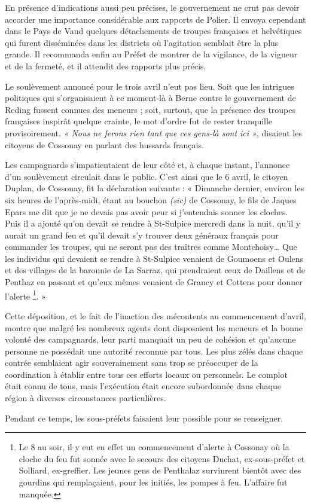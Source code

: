 \documentclass[french,twoside]{book} %
\begin{document}
En présence d’indications aussi peu précises, le gouvernement ne crut pas devoir accorder une importance considérable aux rapports de Polier. Il envoya cependant dans le Pays de Vaud quelques détachements de troupes françaises et helvétiques qui furent disséminées dans les districts où l’agitation semblait être la plus grande. Il recommanda enfin au Préfet de montrer de la vigilance, de la vigueur et de la fermeté, et il attendit des rapports plus précis.\par
Le soulèvement annoncé pour le trois avril n’eut pas lieu. Soit que les intrigues politiques qui s’organisaient à ce moment-là à Berne contre le gouvernement de Reding fussent connues des meneurs ; soit, surtout, que la présence des troupes françaises inspirât quelque crainte, le mot d’ordre fut de rester tranquille provisoirement. \emph{« Nous ne ferons rien tant que ces gens-là sont ici »}, disaient les citoyens de Cossonay en parlant des hussards français.\par
Les campagnards s’impatientaient de leur côté et, à chaque instant, l’annonce d’un soulèvement circulait dans le public. C’est ainsi que le 6 avril, le citoyen Duplan, de Cossonay, fit la déclaration suivante : « Dimanche dernier, environ les six heures de l’après-midi, étant au bouchon \emph{(sic)} de Cossonay, le fils de Jaques Epars me dit que je ne devais pas avoir peur si j’entendais sonner les cloches. Puis il a ajouté qu’on devait se rendre à St-Sulpice mercredi dans la nuit, qu’il y aurait un grand feu et qu’il devait s’y trouver deux généraux français pour commander les troupes, qui ne seront pas des traîtres comme Montchoisy… Que les individus qui devaient se rendre à St-Sulpice venaient de Goumoens et Oulens et des villages de la baronnie de La Sarraz, qui prendraient ceux de Daillens et de Penthaz en passant et qu’eux mêmes venaient de Grancy et Cottens pour donner l’alerte \footnote{Le 8 au soir, il y eut en effet un commencement d’alerte à Cossonay où la cloche du feu fut sonnée avec le secours des citoyens Duchat, ex-sous-préfet et Solliard, ex-greffier. Les jeunes gens de Penthalaz survinrent bientôt avec des gourdins qui remplaçaient, pour les initiés, les pompes à feu. L’affaire fut manquée.}. »\par
Cette déposition, et le fait de l’inaction des mécontents au commencement d’avril, montre que malgré les nombreux agents dont disposaient les meneurs et la bonne volonté des campagnards, leur parti manquait un peu de cohésion et qu’aucune personne ne possédait une autorité reconnue par tous. Les plus zélés dans chaque contrée semblaient agir souverainement sans trop se préoccuper de la coordination à établir entre tous ces efforts locaux ou personnels. Le complot était connu de tous, mais l’exécution était encore subordonnée dans chaque région à diverses circonstances particulières.\par
Pendant ce temps, les sous-préfets faisaient leur possible pour se renseigner.\par
\end{document}
